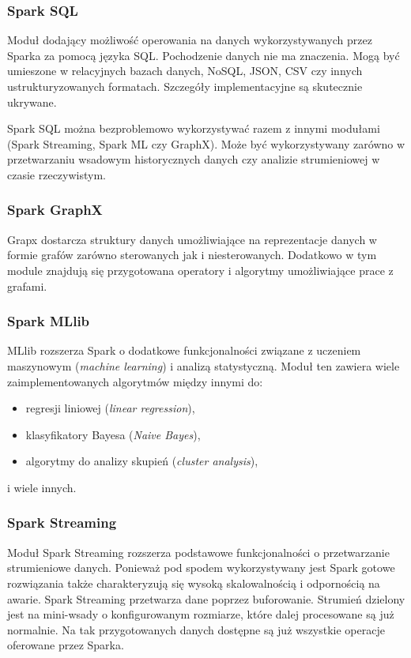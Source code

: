 \subsubsection*{Spark SQL}
Moduł dodający możliwość operowania na danych wykorzystywanych przez Sparka za pomocą języka SQL.
Pochodzenie danych nie ma znaczenia. Mogą być umieszone w
relacyjnych bazach danych, NoSQL, JSON, CSV czy innych ustrukturyzowanych formatach.
Szczegóły implementacyjne są skutecznie ukrywane.

Spark SQL można bezproblemowo wykorzystywać razem z innymi modułami (Spark Streaming, Spark ML czy GraphX).
Może być wykorzystywany zarówno w przetwarzaniu wsadowym historycznych danych
czy analizie strumieniowej w czasie rzeczywistym.
\subsubsection*{Spark GraphX}
Grapx dostarcza struktury danych umożliwiające na reprezentacje danych w formie grafów
zarówno sterowanych jak i niesterowanych.
Dodatkowo w tym module znajdują się przygotowana operatory i algorytmy umożliwiające prace z grafami.
\subsubsection*{Spark MLlib}
MLlib rozszerza Spark o dodatkowe funkcjonalności związane z uczeniem maszynowym (\textit{machine learning})
i analizą statystyczną.
Moduł ten zawiera wiele zaimplementowanych algorytmów między innymi do:
\begin{itemize}
  \item regresji liniowej (\textit{linear regression}),
  \item klasyfikatory Bayesa (\textit{Naive Bayes}),
  \item algorytmy do analizy skupień (\textit{cluster analysis}),
\end{itemize}
i wiele innych.
\subsubsection*{Spark Streaming}
Moduł Spark Streaming rozszerza podstawowe funkcjonalności o przetwarzanie strumieniowe danych.
Ponieważ pod spodem wykorzystywany jest Spark gotowe rozwiązania także charakteryzują się wysoką skalowalnością
i odpornością na awarie.
Spark Streaming przetwarza dane poprzez buforowanie.
Strumień dzielony jest na mini-wsady o konfigurowanym rozmiarze,
które dalej procesowane są już normalnie.
Na tak przygotowanych danych dostępne są już wszystkie operacje oferowane przez Sparka.
